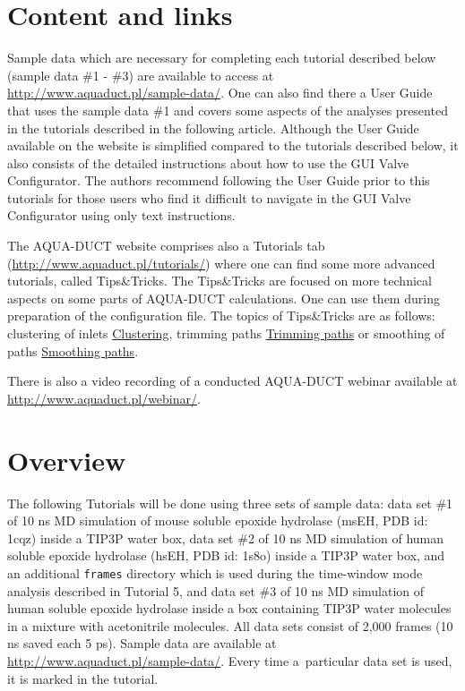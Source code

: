 \documentclass[9pt,tutorial]{livecoms}
\begin{document}
\section{Content and links}

Sample data which are necessary for completing each tutorial described below (sample data \#1 - \#3) are available to access at \url{http://www.aquaduct.pl/sample-data/}. One can also find there a User Guide that uses the sample data \#1 and covers some aspects of the analyses presented in the tutorials described in the following article. Although the User Guide available on the website is simplified compared to the tutorials described below, it also consists of the detailed instructions about how to use the GUI Valve Configurator. The authors recommend following the User Guide prior to this tutorials for those users who find it difficult to navigate in the GUI Valve Configurator using only text instructions. 

The AQUA-DUCT website comprises also a Tutorials tab (\url{http://www.aquaduct.pl/tutorials/}) where one can find some more advanced tutorials, called Tips\&Tricks. The Tips\&Tricks are focused on more technical aspects on some parts of AQUA-DUCT calculations. One can use them during preparation of the configuration file. The topics of Tips\&Tricks are as follows: clustering of inlets \href{http://www.aquaduct.pl/clustering/}{Clustering}, trimming paths \href{http://www.aquaduct.pl/trimming-paths/}{Trimming paths} or smoothing of paths \href{http://www.aquaduct.pl/smoothing-paths/}{Smoothing paths}.

There is also a video recording of a conducted AQUA-DUCT webinar available at \url{http://www.aquaduct.pl/webinar/}.

\section{Overview}
The following Tutorials will be done using three sets of sample data: data set \#1 of 10 ns MD simulation of mouse soluble epoxide hydrolase (msEH, PDB id: 1cqz) inside a TIP3P water box, data set \#2 of 10 ns MD simulation of human soluble epoxide hydrolase (hsEH, PDB id: 1s8o) inside a TIP3P water box, and an additional \texttt{frames} directory which is used during the time-window mode analysis described in Tutorial 5, and data set \#3 of 10 ns MD simulation of human soluble epoxide hydrolase inside a box containing TIP3P water molecules in a mixture with acetonitrile molecules. All data sets consist of 2,000 frames (10 ns saved each 5 ps). Sample data are available at \url{http://www.aquaduct.pl/sample-data/}. Every time a~particular data set is used, it is marked in the tutorial.
\end{document}
